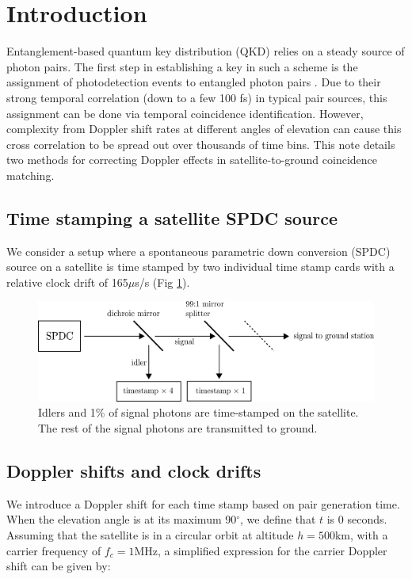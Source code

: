\section{Introduction}
Entanglement-based quantum key distribution (QKD) relies on a steady source of photon pairs. The first step in establishing a key in such a scheme is the assignment of photodetection events to entangled photon pairs \cite{ho2009clock}. Due to their strong temporal correlation (down to a few 100 fs) in typical pair sources, this assignment can be done via temporal coincidence identification. However, complexity from Doppler shift rates at different angles of elevation can cause this cross correlation to be spread out over thousands of time bins. This note details two methods for correcting Doppler effects in satellite-to-ground coincidence matching. 

\subsection{Time stamping a satellite SPDC source}

We consider a setup where a spontaneous parametric down conversion (SPDC) source on a satellite is time stamped by two individual time stamp cards with a relative clock drift of 165$\mu$s/s (Fig \ref{fig:spdc_source}).\\ 

\begin{figure}[ht!]
	\includegraphics[width=\linewidth]{assets/spdc_source}
	\caption{Idlers and 1\% of signal photons are time-stamped on the satellite. The rest of the signal photons are transmitted to ground.}
	\label{fig:spdc_source}
\end{figure}

\newpage

\subsection{Doppler shifts and clock drifts}
We introduce a Doppler shift for each time stamp based on pair generation time. When the elevation angle is at its maximum 90$^\circ$, we define that $t$ is 0 seconds. Assuming that the satellite is in a circular orbit at altitude $h = 500$km, with a carrier frequency of $f_c = 1$MHz, a simplified expression for the carrier Doppler shift can be given by:

